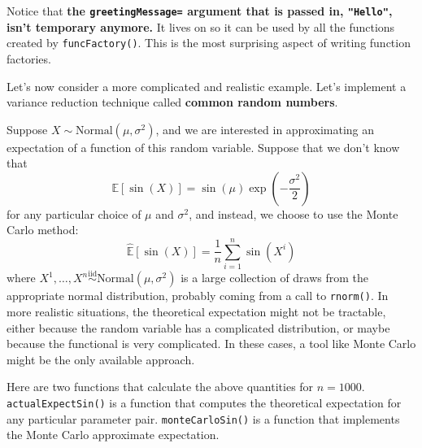 \documentclass[
  12pt,
  krantz2]{krantz}
\begin{document}
Notice that \textbf{the \texttt{greetingMessage=} argument that is passed in, \texttt{"Hello"}, isn't temporary anymore.} It lives on so it can be used by all the functions created by \texttt{funcFactory()}. This is the most surprising aspect of writing function factories.

Let's now consider a more complicated and realistic example. Let's implement a variance reduction technique called \textbf{common random numbers}.

Suppose \(X \sim \text{Normal}(\mu, \sigma^2)\), and we are interested in approximating an expectation of a function of this random variable. Suppose that we don't know that
\begin{equation} 
\mathbb{E}[\sin(X)] = \sin(\mu) \exp\left(-\frac{\sigma^2}{2}\right)
\end{equation}
for any particular choice of \(\mu\) and \(\sigma^2\), and instead, we choose to use the Monte Carlo method:
\begin{equation} 
\hat{\mathbb{E}}[\sin(X)] = \frac{1}{n}\sum_{i=1}^n\sin(X^i)
\end{equation}
where \(X^1, \ldots, X^n \overset{\text{iid}}{\sim} \text{Normal}(\mu, \sigma^2)\) is a large collection of draws from the appropriate normal distribution, probably coming from a call to \texttt{rnorm()}. In more realistic situations, the theoretical expectation might not be tractable, either because the random variable has a complicated distribution, or maybe because the functional is very complicated. In these cases, a tool like Monte Carlo might be the only available approach.

Here are two functions that calculate the above quantities for \(n=1000\). \texttt{actualExpectSin()} is a function that computes the theoretical expectation for any particular parameter pair. \texttt{monteCarloSin()} is a function that implements the Monte Carlo approximate expectation.
\end{document}

